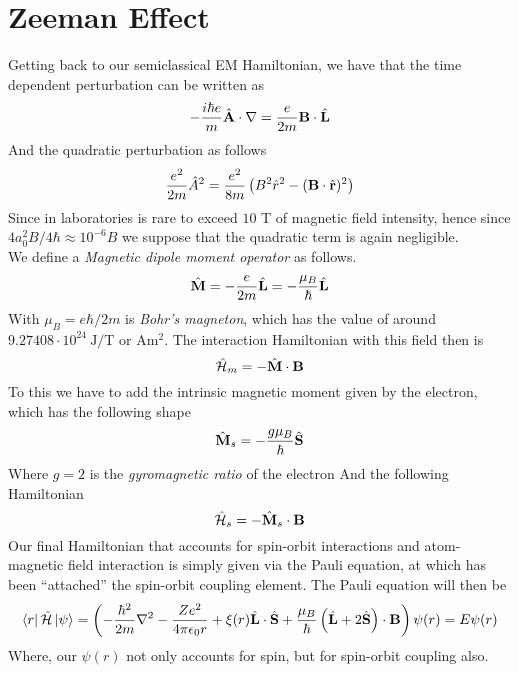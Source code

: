 \documentclass[../qm.tex]{subfiles}
\begin{document}
	\section{Zeeman Effect}
	Getting back to our semiclassical EM Hamiltonian, we have that the time dependent perturbation can be written as
	\begin{equation*}
		-\frac{i\hbar e}{m}\hat{\mathbf{A}}\cdot\nabla=\frac{e}{2m}\mathbf{B}\cdot\hat{\mathbf{L}}
	\end{equation*}
	And the quadratic perturbation as follows
	\begin{equation*}
		\frac{e^2}{2m}\hat{A}^2=\frac{e^2}{8m}\left( B^2\hat{r}^2-(\mathbf{B}\cdot\hat{\mathbf{r}})^2 \right)
	\end{equation*}
	Since in laboratories is rare to exceed $10$ T of magnetic field intensity, hence since $4a_0^2B/4\hbar\approx 10^{-6}B$ we suppose that the quadratic term is again negligible.\\
	We define a \textit{Magnetic dipole moment operator} as follows.\\
	\begin{equation}
		\hat{\mathbf{M}}=-\frac{e}{2m}\hat{\mathbf{L}}=-\frac{\mu_B}{\hbar}\hat{\mathbf{L}}
		\label{eq:mmomopr}
	\end{equation}
	With $\mu_B=e\hbar/2m$ is \textit{Bohr's magneton}, which has the value of around $9.27408\cdot10^{24}\ \mathrm{J/T}$ or $\mathrm{Am^2}$. The interaction Hamiltonian with this field then is
	\begin{equation}
		\hat{\mathcal{H}}_{m}=-\hat{\mathbf{M}}\cdot\mathbf{B}
		\label{eq:interactionhammag}
	\end{equation}
	To this we have to add the intrinsic magnetic moment given by the electron, which has the following shape
	\begin{equation}
		\hat{\mathbf{M}}_s=-\frac{g\mu_B}{\hbar}\hat{\mathbf{S}}
		\label{eq:spinmmopr}
	\end{equation}
	Where $g=2$ is the \textit{gyromagnetic ratio} of the electron
	And the following Hamiltonian
	\begin{equation}
		\hat{\mathcal{H}}_s=-\hat{\mathbf{M}}_s\cdot\mathbf{B}
		\label{eq:interactionhamspin}
	\end{equation}
	Our final Hamiltonian that accounts for spin-orbit interactions and atom-magnetic field interaction is simply given via the Pauli equation, at which has been ``attached'' the spin-orbit coupling element. The Pauli equation will then be
	\begin{equation}
		\bra{r}\hat{\mathcal{H}}\ket{\psi}=\left( -\frac{\hbar^2}{2m}\nabla^2-\frac{Ze^2}{4\pi\epsilon_0r}+\xi(r)\hat{\mathbf{L}}\cdot\hat{\mathbf{S}}+\frac{\mu_B}{\hbar}\left( \hat{\mathbf{L}}+2\hat{\mathbf{S}} \right)\cdot\mathbf{B} \right)\psi(r)=E\psi(r)
		\label{eq:sopauliequation}
	\end{equation}
	Where, our $\psi(r)$ not only accounts for spin, but for spin-orbit coupling also.
\end{document}
